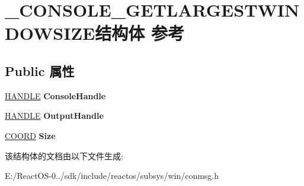 \hypertarget{struct___c_o_n_s_o_l_e___g_e_t_l_a_r_g_e_s_t_w_i_n_d_o_w_s_i_z_e}{}\section{\+\_\+\+C\+O\+N\+S\+O\+L\+E\+\_\+\+G\+E\+T\+L\+A\+R\+G\+E\+S\+T\+W\+I\+N\+D\+O\+W\+S\+I\+Z\+E结构体 参考}
\label{struct___c_o_n_s_o_l_e___g_e_t_l_a_r_g_e_s_t_w_i_n_d_o_w_s_i_z_e}
\subsection*{Public 属性}
\begin{DoxyCompactItemize}
\item 
\mbox{\label{struct___c_o_n_s_o_l_e___g_e_t_l_a_r_g_e_s_t_w_i_n_d_o_w_s_i_z_e_a4405da1acf1c7f7e185466158e20c42f}} 
\hyperlink{interfacevoid}{H\+A\+N\+D\+LE} {\bfseries Console\+Handle}
\item 
\mbox{\label{struct___c_o_n_s_o_l_e___g_e_t_l_a_r_g_e_s_t_w_i_n_d_o_w_s_i_z_e_a7d4e190a64005a7b25badfdac0784932}} 
\hyperlink{interfacevoid}{H\+A\+N\+D\+LE} {\bfseries Output\+Handle}
\item 
\mbox{\label{struct___c_o_n_s_o_l_e___g_e_t_l_a_r_g_e_s_t_w_i_n_d_o_w_s_i_z_e_a5947c444c48ca09aeb829f208322d978}} 
\hyperlink{struct___c_o_o_r_d}{C\+O\+O\+RD} {\bfseries Size}
\end{DoxyCompactItemize}


该结构体的文档由以下文件生成\+:\begin{DoxyCompactItemize}
\item 
E\+:/\+React\+O\+S-\/0../sdk/include/reactos/subsys/win/conmsg.\+h\end{DoxyCompactItemize}
